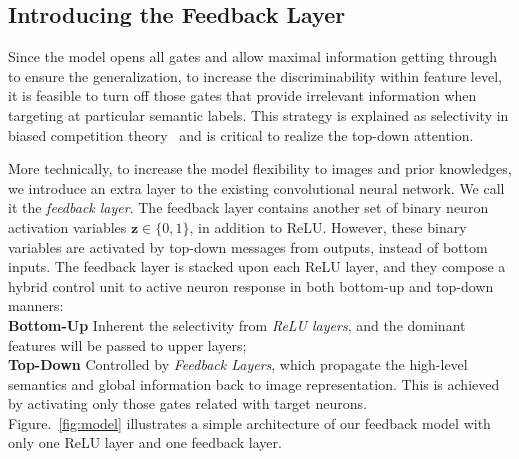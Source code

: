 
\subsection{Introducing the Feedback Layer}
Since the model opens all gates and allow maximal information getting through to ensure the generalization, to increase the discriminability within feature level, it is feasible to turn off those gates that provide irrelevant information when targeting at particular semantic labels. This strategy is explained as selectivity in biased competition theory~\cite{desimone1995neural} and is critical to realize the top-down attention.

More technically, to increase the model flexibility to images and prior knowledges, we introduce an extra layer to the existing convolutional neural network. We call it the \emph{feedback layer}. The feedback layer contains another set of binary neuron activation variables $\mathbf{z} \in \{0, 1\}$, {\color{red} in addition} to ReLU. However, these binary variables are activated by top-down messages from outputs, instead of bottom inputs.
%
The feedback layer is stacked upon each ReLU layer, and they compose a hybrid control unit to active neuron response in both bottom-up and top-down manners:
\\\textbf{Bottom-Up} Inherent the selectivity from \emph{ReLU layers}, and the dominant features will be passed to upper layers;
\\\textbf{Top-Down} Controlled by \emph{Feedback Layers}, which propagate the high-level semantics and global information back to image representation. This is achieved by activating only those gates related with target neurons.
\\Figure.~\ref{fig:model} illustrates a simple architecture of our feedback model with only one ReLU layer and one feedback layer.

